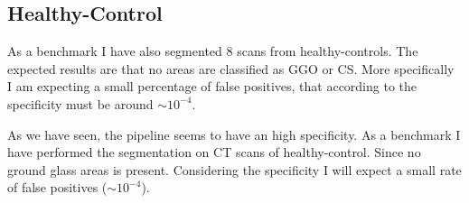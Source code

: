 
	\subsection{Healthy-Control}
	
	
	As a benchmark I have also segmented $8$ scans from healthy-controls. The expected results are that no areas are classified as GGO or CS. More specifically I am expecting a small percentage of false positives, that according to the specificity must be around $\sim 10^{-4}$.
	
	As we have seen, the pipeline seems to have an high specificity. As a benchmark I have performed the segmentation on CT scans of healthy-control. Since no ground glass areas is present. Considering the specificity I will expect a small rate of false positives ($\sim 10^{-4}$).

	
	
	
	

